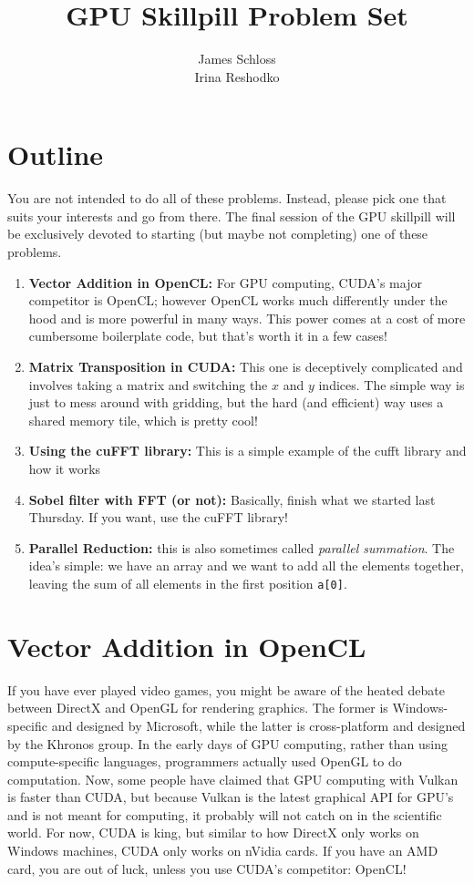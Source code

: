 \documentclass[11pt]{article}
\title{\textbf{GPU Skillpill Problem Set}}
\author{James Schloss\\
		Irina Reshodko}
\date{}
\begin{document}
\maketitle

\section*{Outline}

You are not intended to do all of these problems. Instead, please pick one that suits your interests and go from there. The final session of the GPU skillpill will be exclusively devoted to starting (but maybe not completing) one of these problems.

\begin{enumerate}
\item \textbf{Vector Addition in OpenCL:} For GPU computing, CUDA's major competitor is OpenCL; however OpenCL works much differently under the hood and is more powerful in many ways. This power comes at a cost of more cumbersome boilerplate code, but that's worth it in a few cases!
\item \textbf{Matrix Transposition in CUDA:} This one is deceptively complicated and involves taking a matrix and switching the $x$ and $y$ indices. The simple way is just to mess around with gridding, but the hard (and efficient) way uses a shared memory tile, which is pretty cool!
\item \textbf{Using the cuFFT library:} This is a simple example of the cufft library and how it works
\item \textbf{Sobel filter with FFT (or not):} Basically, finish what we started last Thursday. If you want, use the cuFFT library!
\item \textbf{Parallel Reduction:} this is also sometimes called \textit{parallel summation}. The idea's simple: we have an array and we want to add all the elements together, leaving the sum of all elements in the first position \lstinline{a[0]}.
\end{enumerate}

\newpage
\section*{Vector Addition in OpenCL}
If you have ever played video games, you might be aware of the heated debate between DirectX and OpenGL for rendering graphics. 
The former is Windows-specific and designed by Microsoft, while the latter is cross-platform and designed by the Khronos group. 
In the early days of GPU computing, rather than using compute-specific languages, programmers actually used OpenGL to do computation. Now, some people have claimed that GPU computing with Vulkan is faster than CUDA, but because Vulkan is the latest graphical API for GPU's and is not meant for computing, it probably will not catch on in the scientific world.
For now, CUDA is king, but similar to how DirectX only works on Windows machines, CUDA only works on nVidia cards. 
If you have an AMD card, you are out of luck, unless you use CUDA's competitor: OpenCL!
\end{document}

